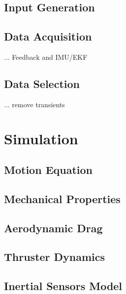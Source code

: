\subsection{Input Generation}
\label{sub:input_generation}


\subsection{Data Acquisition}
\label{sub:data_acquisition}
... Feedback and IMU/EKF

\subsection{Data Selection}
\label{sub:data_selection}
... remove transients


\section{Simulation}
\label{sec:simulation}

\subsection{Motion Equation}
\label{sub:motion_equation}

\subsection{Mechanical Properties}
\label{sub:mech_properties}

\subsection{Aerodynamic Drag}
\label{sub:aero_drag}

\subsection{Thruster Dynamics}
\label{sub:thrust_dynamics}

\subsection{Inertial Sensors Model}
\label{sub:imu_model}

